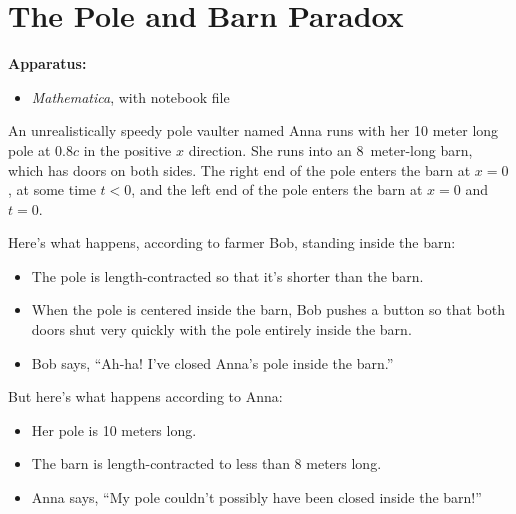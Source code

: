 \section{The Pole and Barn Paradox}

\makelabheader %


\bigskip
\textbf{Apparatus:}
\begin{itemize}[nosep]
\item \textit{Mathematica}, with notebook file 
\end{itemize}

\bigskip

An unrealistically speedy pole vaulter named Anna runs with her 10 meter long pole at $0.8 c$ in the positive $x$ direction. She runs into an 8~meter-long barn, which has doors on both sides.  The right end of the pole enters the barn at $x = 0$, at some time $t < 0$, and the left end of the pole enters the barn at $x = 0$ and $t = 0$.

Here's what happens, according to farmer Bob, standing inside the barn:
\begin{itemize}[nosep]
\item The pole is length-contracted so that it's shorter than the barn.
\item When the pole is centered inside the barn, Bob pushes a button so that both doors shut very quickly with the pole entirely inside the barn.
\item Bob says, ``Ah-ha! I've closed Anna's pole inside the barn.''
\end{itemize}

But here's what happens according to Anna:
\begin{itemize}[nosep]
\item Her pole is 10 meters long.
\item The barn is length-contracted to less than 8 meters long.
\item Anna says, ``My pole couldn't possibly have been closed inside the barn!''
\end{itemize}

